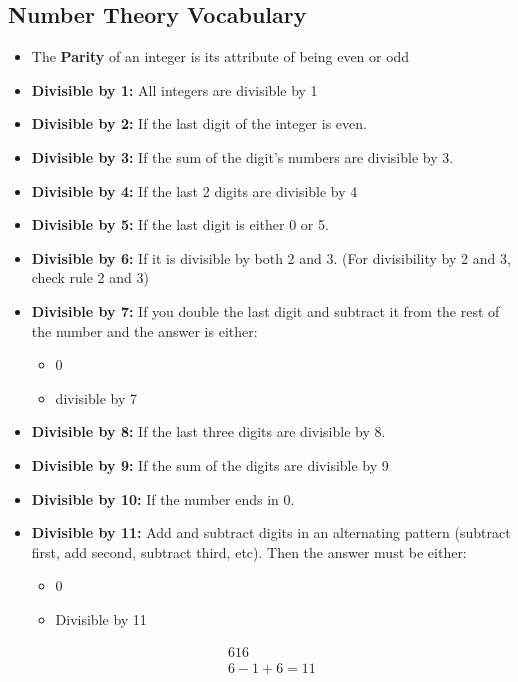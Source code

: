 \documentclass{report}
\begin{document}
      \subsection{Number Theory Vocabulary}
      \bigbreak \noindent 
      \begin{itemize}
        \item The \textbf{Parity} of an integer is its attribute of being even or odd
        \item \textbf{Divisible by 1:} All integers are divisible by 1
          \item \textbf{Divisible by 2:} If the last digit of the integer is even.
        \item \textbf{Divisible by 3:} If the sum of the digit’s numbers are divisible by 3.
        \item \textbf{Divisible by 4:} If the last 2 digits are divisible by 4
        \item \textbf{Divisible by 5:} If the last digit is either 0 or 5.
        \item \textbf{Divisible by 6:} If it is divisible by both 2 and 3. (For divisibility by 2 and 3, check rule 2 and 3)
        \item \textbf{Divisible by 7:}  If you double the last digit and subtract it from the rest of the number and the answer is either:
        \begin{itemize}
            \item 0
            \item divisible by 7
        \end{itemize}
      \item \textbf{Divisible by 8:} If the last three digits are divisible by 8.
        \item \textbf{Divisible by 9:} If the sum of the digits are divisible by 9
        \item \textbf{Divisible by 10:} If the number ends in 0.
        \item \textbf{Divisible by 11:}  Add and subtract digits in an alternating pattern (subtract first, add second, subtract third, etc). Then the answer must be either:
            \begin{itemize}
                \item 0 
                \item Divisible by 11
            \end{itemize}
            \begin{align*}
              616 \\
              6 -1  + 6 = 11 \\

\end{align*}
\end{itemize}
\end{document}
